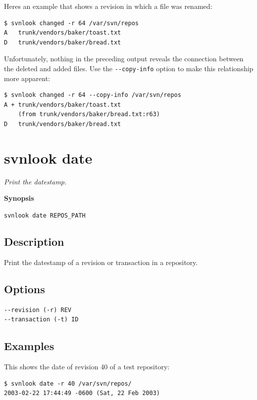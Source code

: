 Here\textquotesingle s an example that shows a revision in which a file
was renamed:

\begin{verbatim}
$ svnlook changed -r 64 /var/svn/repos
A   trunk/vendors/baker/toast.txt
D   trunk/vendors/baker/bread.txt
\end{verbatim}

Unfortunately, nothing in the preceding output reveals the connection
between the deleted and added files. Use the \texttt{-\/-copy-info}
option to make this relationship more apparent:

\begin{verbatim}
$ svnlook changed -r 64 --copy-info /var/svn/repos
A + trunk/vendors/baker/toast.txt
    (from trunk/vendors/baker/bread.txt:r63)
D   trunk/vendors/baker/bread.txt
\end{verbatim}

\section{svnlook date}\label{svn.ref.svnlook.c.date}

\emph{Print the datestamp.}

\textbf{Synopsis}

\texttt{svnlook\ date\ REPOS\_PATH}

\subsection{Description}

Print the datestamp of a revision or transaction in a repository.

\subsection{Options}

\begin{verbatim}
--revision (-r) REV
--transaction (-t) ID
\end{verbatim}

\subsection{Examples}

This shows the date of revision 40 of a test repository:

\begin{verbatim}
$ svnlook date -r 40 /var/svn/repos/
2003-02-22 17:44:49 -0600 (Sat, 22 Feb 2003)
\end{verbatim}


